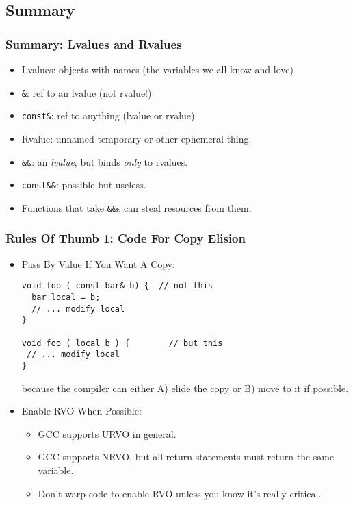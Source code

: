 \subsection[Summary]{Summary}

\begin{frame}[fragile]
\frametitle {Summary: Lvalues and Rvalues}
\begin{itemize}[<+->]
\item Lvalues: objects with names (the variables we all know and love)
\item \texttt{\&}: ref to an lvalue (not rvalue!)
\item \texttt{const\&}: ref to anything (lvalue or rvalue)
\item Rvalue: unnamed temporary or other ephemeral thing. 
\item \texttt{\&\&}: an \emph{lvalue}, but binds \emph{only} to rvalues.
\item \texttt{const\&\&}: possible but useless.
\vskip 6pt
\item Functions that take \texttt{\&\&}s can steal resources from them.
\end{itemize}
\end{frame}


\begin{frame}[fragile]
\frametitle {Rules Of Thumb 1: Code For Copy Elision}
\begin{itemize}[<+->]
\item Pass By Value If You Want A Copy:
{\scriptsize
\begin{verbatim}
void foo ( const bar& b) {  // not this
  bar local = b;
  // ... modify local
}

void foo ( local b ) {        // but this
 // ... modify local 
}

\end{verbatim}
}
because the compiler can either A) elide the copy or B) move to it if
possible.

\vskip 12pt
\item Enable RVO When Possible:
  \begin{itemize}
    \item GCC supports URVO in general.
    \item GCC supports NRVO, but all return statements must return the
      same variable.
    \item Don't warp code to enable RVO unless you know it's really
      critical.
   \end{itemize}

\end{itemize}
\end{frame}

